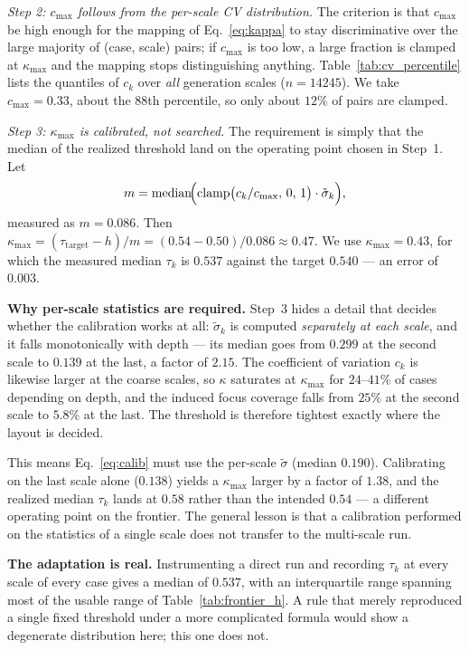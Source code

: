 \noindent\textit{Step 2: $c_{\max}$ follows from the per-scale CV distribution.}
The criterion is that $c_{\max}$ be high enough for the mapping of
Eq.~\ref{eq:kappa} to stay discriminative over the large majority of (case,
scale) pairs; if $c_{\max}$ is too low, a large fraction is clamped at
$\kappa_{\max}$ and the mapping stops distinguishing anything.
Table~\ref{tab:cv_percentile} lists the quantiles of $c_k$ over \emph{all}
generation scales ($n = 14245$). We take $c_{\max} = 0.33$, about the 88th
percentile, so only about $12\%$ of pairs are clamped.

\noindent\textit{Step 3: $\kappa_{\max}$ is calibrated, not searched.}
The requirement is simply that the median of the realized threshold land on the
operating point chosen in Step~1. Let
\begin{equation}
    m = \operatorname{median}\!\Bigl(\operatorname{clamp}\bigl(c_k/c_{\max},\,0,\,1\bigr)
    \cdot \tilde{\sigma}_k\Bigr),
    \label{eq:calib}
\end{equation}
measured as $m = 0.086$. Then
$\kappa_{\max} = (\tau_{\mathrm{target}} - h)/m = (0.54 - 0.50)/0.086 \approx 0.47$.
We use $\kappa_{\max} = 0.43$, for which the measured median $\tau_k$ is $0.537$
against the target $0.540$ --- an error of $0.003$.

\noindent\textbf{Why per-scale statistics are required.}
Step~3 hides a detail that decides whether the calibration works at all:
$\tilde{\sigma}_k$ is computed \emph{separately at each scale}, and it falls
monotonically with depth --- its median goes from $0.299$ at the second scale to
$0.139$ at the last, a factor of $2.15$. The coefficient of variation $c_k$ is
likewise larger at the coarse scales, so $\kappa$ saturates at $\kappa_{\max}$
for $24$--$41\%$ of cases depending on depth, and the induced focus coverage
falls from $25\%$ at the second scale to $5.8\%$ at the last. The threshold is
therefore tightest exactly where the layout is decided.

This means Eq.~\ref{eq:calib} must use the per-scale $\tilde{\sigma}$ (median
$0.190$). Calibrating on the last scale alone ($0.138$) yields a $\kappa_{\max}$
larger by a factor of $1.38$, and the realized median $\tau_k$ lands at $0.58$
rather than the intended $0.54$ --- a different operating point on the frontier.
The general lesson is that a calibration performed on the statistics of a single
scale does not transfer to the multi-scale run.

\noindent\textbf{The adaptation is real.}
Instrumenting a direct run and recording $\tau_k$ at every scale of every case
gives a median of $0.537$, with an interquartile range spanning most of the
usable range of Table~\ref{tab:frontier_h}. A rule that merely reproduced a
single fixed threshold under a more complicated formula would show a degenerate
distribution here; this one does not.

